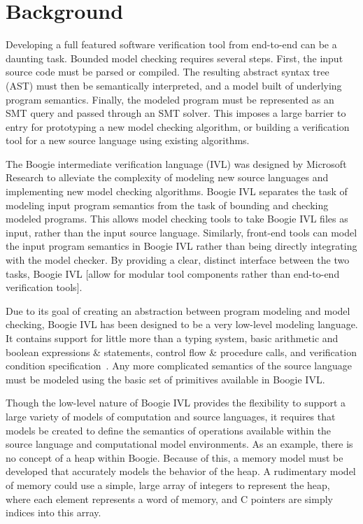 \chapter{Background}\label{ch:background}
Developing a full featured software verification tool from end-to-end
can be a daunting task.  Bounded model checking requires several
steps.  First, the input source code must be parsed or compiled.  The
resulting abstract syntax tree (AST) must then be semantically
interpreted, and a model built of underlying program semantics.
Finally, the modeled program must be represented as an SMT query and
passed through an SMT solver.  This imposes a large barrier to entry
for prototyping a new model checking algorithm, or building a
verification tool for a new source language using existing
algorithms. 

The Boogie intermediate verification language (IVL) was designed by
Microsoft Research to alleviate the complexity of modeling new source
languages and implementing new model checking algorithms.  Boogie IVL
separates the task of modeling input program semantics from the task
of bounding and checking modeled programs.  This allows model checking
tools to take Boogie IVL files as input, rather than the input source
language.  Similarly, front-end tools can model the input program
semantics in Boogie IVL rather than being directly integrating with
the model checker.  By providing a clear, distinct interface between
the two tasks, Boogie IVL [allow for modular tool components rather
than end-to-end verification tools]. 

Due to its goal of creating an abstraction between program modeling
and model checking, Boogie IVL has been designed to be a very
low-level modeling language.  It contains support for little more than
a typing system, basic arithmetic and boolean expressions \&
statements, control flow \& procedure calls, and verification
condition specification~\cite{boogie}.  Any more complicated semantics
of the source language must be modeled using the basic set of
primitives available in Boogie IVL. 

Though the low-level nature of Boogie IVL provides the flexibility to
support a large variety of models of computation and source languages,
it requires that models be created to define the semantics of
operations available within the source language and computational
model environments.  As an example, there is no concept of a heap
within Boogie.  Because of this, a memory model must be developed that
accurately models the behavior of the heap.  A rudimentary model of
memory could use a simple, large array of integers to represent the
heap, where each element represents a word of memory, and C pointers
are simply indices into this array. 


